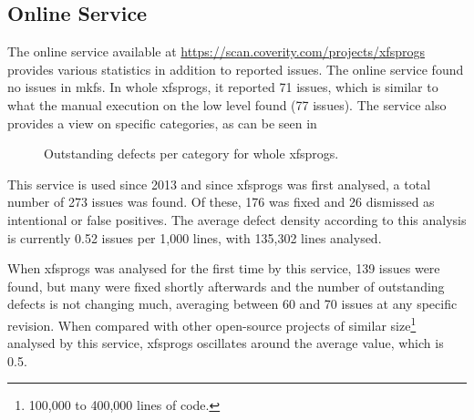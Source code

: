 \subsection{Online Service}\label{chap:results:coverity:online}

The online service available at
\url{https://scan.coverity.com/projects/xfsprogs} provides various statistics
in addition to reported issues. The online service found no issues in mkfs. In
whole xfsprogs, it reported 71 issues, which is similar to what the manual
execution on the low level found (77 issues). The service also provides a view on
specific categories, as can be seen in 

\begin{figure}
\caption{Outstanding defects per category for whole xfsprogs.}
\label{fig:results:coverity:defects}
\end{figure}

This service is used since 2013 and since xfsprogs was first analysed, a total
number of 273 issues was found. Of these, 176 was fixed and 26 dismissed as
intentional or false positives. The average defect density according to this
analysis is currently 0.52 issues per 1,000 lines, with 135,302 lines analysed.

When xfsprogs was analysed for the first time by this service, 139 issues were
found, but many were fixed shortly afterwards and the number of outstanding
defects is not changing much, averaging between 60 and 70 issues at any
specific revision. When compared with other open-source projects of similar
size\footnote{100,000 to 400,000 lines of code.} analysed by this service,
xfsprogs oscillates around the average value, which is 0.5.

